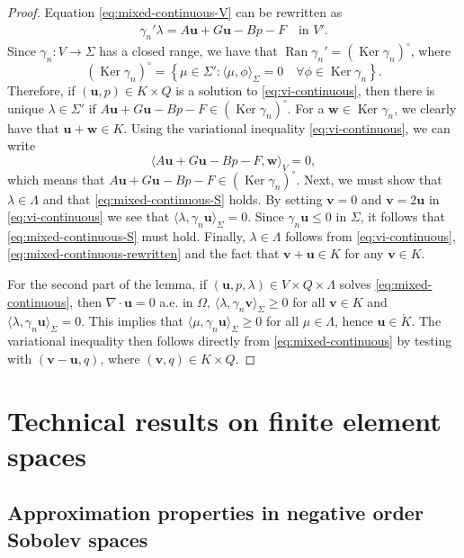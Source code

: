 \documentclass[onefignum,onetabnum]{siamart190516}
\newcommand{\bu}{\boldsymbol{u}}
\newcommand{\bv}{\boldsymbol{v}}
\newcommand{\bw}{\boldsymbol{w}}
\newcommand{\Ko}{\mathring{K}}
\DeclareMathOperator*{\Ran}{Ran}
\DeclareMathOperator*{\Ker}{Ker}
\begin{document}
\begin{proof}
	Equation \eqref{eq:mixed-continuous-V} can be rewritten as 
	\begin{align}\label{eq:mixed-continuous-rewritten}
		\gamma_n'\lambda = A\bu + G\bu - Bp - F \quad \text{in $V'$}.
	\end{align}
	Since $\gamma_n: V \to \Sigma$ has a closed range, we have that $\Ran{\gamma_n'} = \left( \Ker{\gamma_n}\right)^\circ$, where
	\[
		\left( \Ker{\gamma_n}\right)^\circ = \left\lbrace \mu\in\Sigma' : \langle \mu, \phi \rangle_\Sigma = 0 \quad \forall \phi\in\Ker{\gamma_n}\right\rbrace.
	\]
	Therefore, if $(\bu,p)\in K\times Q$ is a solution to \eqref{eq:vi-continuous}, then there is unique $\lambda\in \Sigma'$ if $A\bu + G\bu - Bp - F\in \left( \Ker{\gamma_n}\right)^\circ$. For a $\bw\in\Ker{\gamma_n}$, we clearly have that $\bu + \bw \in K$. Using the variational inequality \eqref{eq:vi-continuous}, we can write
	\[
		\langle A\bu + G\bu - Bp - F, \bw \rangle_V = 0,
	\]
	which means that $A\bu + G\bu - Bp - F\in \left( \Ker{\gamma_n}\right)^\circ$. Next, we must show that $\lambda\in \Lambda$ and that \eqref{eq:mixed-continuous-S} holds. By setting $\bv = 0$ and $\bv = 2\bu$ in \eqref{eq:vi-continuous} we see that $\langle \lambda, \gamma_n\bu\rangle_\Sigma = 0$. Since $\gamma_n\bu \leq 0$ in $\Sigma$, it follows that \eqref{eq:mixed-continuous-S} must hold. Finally, $\lambda\in\Lambda$ follows from \eqref{eq:vi-continuous}, \eqref{eq:mixed-continuous-rewritten} and the fact that $\bv + \bu \in K$ for any $\bv \in K$.
	
	For the second part of the lemma, if $(\bu,p,\lambda)\in V\times Q\times \Lambda$ solves \eqref{eq:mixed-continuous}, then $\nabla\cdot \bu = 0$ a.e. in $\Omega$, $\langle\lambda, \gamma_n\bv\rangle_\Sigma \geq 0$ for all $\bv \in K$ and $\langle\lambda, \gamma_n\bu\rangle_\Sigma = 0$. This implies that $\langle\mu, \gamma_n\bu\rangle_\Sigma \geq 0$ for all $\mu\in \Lambda$, hence $\bu\in \Ko$. The variational inequality then follows directly from \eqref{eq:mixed-continuous} by testing with $(\bv - \bu, q)$, where $(\bv,q)\in K\times Q$.	
\end{proof}


\section{Technical results on finite element spaces}

\subsection{Approximation properties in negative order Sobolev spaces} \label{app-subsec:interpolation}
\end{document}
